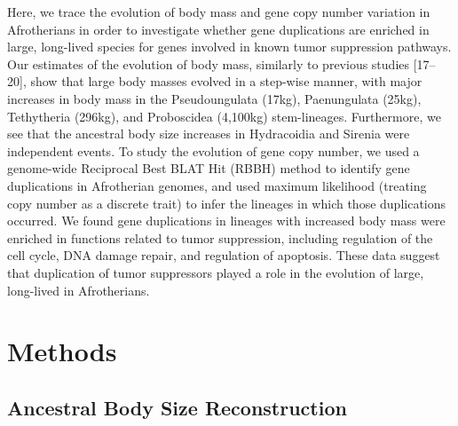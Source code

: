 \documentclass[]{elsarticle} %
\begin{document}
Here, we trace the evolution of body mass and gene copy number variation
in Afrotherians in order to investigate whether gene duplications are
enriched in large, long-lived species for genes involved in known tumor
suppression pathways. Our estimates of the evolution of body mass,
similarly to previous studies {[}17--20{]}, show that large body masses
evolved in a step-wise manner, with major increases in body mass in the
Pseudoungulata (17kg), Paenungulata (25kg), Tethytheria (296kg), and
Proboscidea (4,100kg) stem-lineages. Furthermore, we see that the
ancestral body size increases in Hydracoidia and Sirenia were
independent events. To study the evolution of gene copy number, we used
a genome-wide Reciprocal Best BLAT Hit (RBBH) method to identify gene
duplications in Afrotherian genomes, and used maximum likelihood
(treating copy number as a discrete trait) to infer the lineages in
which those duplications occurred. We found gene duplications in
lineages with increased body mass were enriched in functions related to
tumor suppression, including regulation of the cell cycle, DNA damage
repair, and regulation of apoptosis. These data suggest that duplication
of tumor suppressors played a role in the evolution of large, long-lived
in Afrotherians.

\hypertarget{methods}{%
\section{Methods}\label{methods}}

\hypertarget{ancestral-body-size-reconstruction}{%
\subsection{Ancestral Body Size
Reconstruction}\label{ancestral-body-size-reconstruction}}
\end{document}
